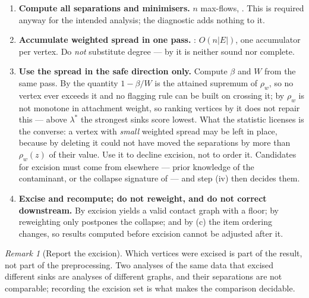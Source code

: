 \documentclass[11pt,a4paper]{article}
\theoremstyle{definition}
\theoremstyle{remark}
\newtheorem{remark}[theorem]{Remark}
\newcommand{\wt}{w}
\newcommand{\flo}{\beta}
\newcommand{\spr}{\rho}                       %
\begin{document}
\begin{enumerate}[label=(\roman*)]
\item \textbf{Compute all separations and minimisers.} $n$ max-flows,
. This is required anyway for the intended
analysis; the diagnostic adds nothing to it.

\item \textbf{Accumulate weighted spread in one pass.}
: $O(n|E|)$, one accumulator per vertex. Do
\emph{not} substitute degree --- by  it is neither
sound nor complete.

\item \textbf{Use the spread in the safe direction only.} Compute $\flo$
and $W$ from the same pass. By  the quantity
$1 - \flo/W$ is the attained supremum of $\spr_{\wt}$, so no vertex ever
exceeds it and no flagging rule can be built on crossing it; by
 $\spr_{\wt}$ is not monotone in attachment
weight, so ranking vertices by it does not repair this --- above
$\lambda^*$ the strongest sinks score lowest. What the statistic
licenses is the converse: a vertex with \emph{small} weighted spread may
be left in place, because by  deleting it
could not have moved the separations by more than $\spr_{\wt}(z)$ of
their value. Use it to decline excision, not to order it. Candidates for
excision must come from elsewhere --- prior knowledge of the
contaminant, or the collapse signature of  --- and
step (iv) then decides them.

\item \textbf{Excise and recompute; do not reweight, and do not correct
downstream.} By  excision yields a valid contact
graph with a floor; by  reweighting only
postpones the collapse; and by (c) the item ordering
changes, so results computed before excision cannot be adjusted after it.
\end{enumerate}

\begin{remark}[Report the excision]\label{rem:report}
Which vertices were excised is part of the result, not part of the
preprocessing. Two analyses of the same data that excised different sinks
are analyses of different graphs, and their separations are not
comparable; recording the excision set is what makes the comparison
decidable.
\end{remark}

\end{document}
